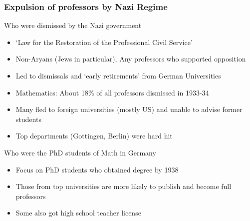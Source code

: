 \documentclass[aspectratio=169]{beamer}
\begin{document}
\begin{frame}
\frametitle{Expulsion of professors by Nazi Regime} 
Who were dismissed by the Nazi government
\begin{itemize}\setlength\itemsep{3pt}
\item `Law for the Restoration of the Professional Civil Service'
\item Non-Aryans (Jews in particular), Any professors who supported opposition
\item Led to dismissals and `early retirements' from German Universities
\item Mathematics: About 18\% of all professors dismissed in 1933-34
\item Many fled to foreign universities (mostly US) and unable to advise former students
\item Top departments (Gottingen, Berlin) were hard hit
\end{itemize}\medskip
Who were the PhD students of Math in Germany
\begin{itemize}\setlength\itemsep{3pt}
\item Focus on PhD students who obtained degree by 1938
\item Those from top universities are more likely to publish and become full professors
\item Some also got high school teacher license
\end{itemize}\medskip
\end{frame}
\end{document}
